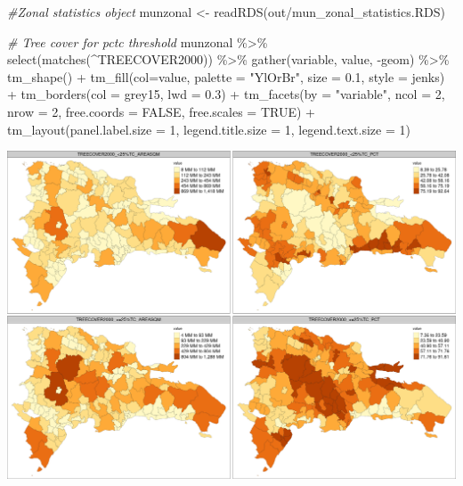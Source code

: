\documentclass[10pt,landscape,a3paper]{article}
\newenvironment{Shaded}{\begin{snugshade}}{\end{snugshade}}
\newcommand{\AttributeTok}[1]{\textcolor[rgb]{0.77,0.63,0.00}{#1}}
\newcommand{\CommentTok}[1]{\textcolor[rgb]{0.56,0.35,0.01}{\textit{#1}}}
\newcommand{\ConstantTok}[1]{\textcolor[rgb]{0.00,0.00,0.00}{#1}}
\newcommand{\DecValTok}[1]{\textcolor[rgb]{0.00,0.00,0.81}{#1}}
\newcommand{\FloatTok}[1]{\textcolor[rgb]{0.00,0.00,0.81}{#1}}
\newcommand{\FunctionTok}[1]{\textcolor[rgb]{0.00,0.00,0.00}{#1}}
\newcommand{\NormalTok}[1]{#1}
\newcommand{\OtherTok}[1]{\textcolor[rgb]{0.56,0.35,0.01}{#1}}
\newcommand{\SpecialCharTok}[1]{\textcolor[rgb]{0.00,0.00,0.00}{#1}}
\newcommand{\StringTok}[1]{\textcolor[rgb]{0.31,0.60,0.02}{#1}}
\begin{document}
\begin{Shaded}
\begin{Highlighting}[]
\CommentTok{\#Zonal statistics object}
\NormalTok{munzonal }\OtherTok{\textless{}{-}} \FunctionTok{readRDS}\NormalTok{(}\StringTok{\textquotesingle{}out/mun\_zonal\_statistics.RDS\textquotesingle{}}\NormalTok{)}

\CommentTok{\# Tree cover for pctc threshold}
\NormalTok{munzonal }\SpecialCharTok{\%\textgreater{}\%} \FunctionTok{select}\NormalTok{(}\FunctionTok{matches}\NormalTok{(}\StringTok{\textquotesingle{}\^{}TREECOVER2000\textquotesingle{}}\NormalTok{)) }\SpecialCharTok{\%\textgreater{}\%}
  \FunctionTok{gather}\NormalTok{(variable, value, }\SpecialCharTok{{-}}\NormalTok{geom) }\SpecialCharTok{\%\textgreater{}\%}
  \FunctionTok{tm\_shape}\NormalTok{() }\SpecialCharTok{+}
  \FunctionTok{tm\_fill}\NormalTok{(}\AttributeTok{col=}\StringTok{\textquotesingle{}value\textquotesingle{}}\NormalTok{, }\AttributeTok{palette =} \StringTok{"YlOrBr"}\NormalTok{, }\AttributeTok{size =} \FloatTok{0.1}\NormalTok{, }\AttributeTok{style =} \StringTok{\textquotesingle{}jenks\textquotesingle{}}\NormalTok{) }\SpecialCharTok{+}
  \FunctionTok{tm\_borders}\NormalTok{(}\AttributeTok{col =} \StringTok{\textquotesingle{}grey15\textquotesingle{}}\NormalTok{, }\AttributeTok{lwd =} \FloatTok{0.3}\NormalTok{) }\SpecialCharTok{+}
  \FunctionTok{tm\_facets}\NormalTok{(}\AttributeTok{by =} \StringTok{"variable"}\NormalTok{, }\AttributeTok{ncol =} \DecValTok{2}\NormalTok{, }\AttributeTok{nrow =} \DecValTok{2}\NormalTok{, }\AttributeTok{free.coords =} \ConstantTok{FALSE}\NormalTok{, }\AttributeTok{free.scales =} \ConstantTok{TRUE}\NormalTok{) }\SpecialCharTok{+}
  \FunctionTok{tm\_layout}\NormalTok{(}\AttributeTok{panel.label.size =} \DecValTok{1}\NormalTok{, }\AttributeTok{legend.title.size =} \DecValTok{1}\NormalTok{, }\AttributeTok{legend.text.size =} \DecValTok{1}\NormalTok{)}
\end{Highlighting}
\end{Shaded}

\begin{center}\includegraphics{img/zonal-mun-1} \end{center}
\end{document}
